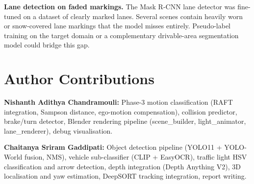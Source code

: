\documentclass[conference]{IEEEtran}
\begin{document}
\textbf{Lane detection on faded markings.}
The Mask R-CNN lane detector was fine-tuned on a dataset of clearly marked
lanes.  Several scenes contain heavily worn or snow-covered lane markings that
the model misses entirely.  Pseudo-label training on the target domain or a
complementary drivable-area segmentation model could bridge this gap.

\section{Author Contributions}

\textbf{Nishanth Adithya Chandramouli:}
Phase-3 motion classification (RAFT integration, Sampson distance, ego-motion
compensation), collision predictor, brake/turn detector, Blender rendering
pipeline (scene\_builder, light\_animator, lane\_renderer), debug visualisation.

\textbf{Chaitanya Sriram Gaddipati:}
Object detection pipeline (YOLO11 + YOLO-World fusion, NMS), vehicle
sub-classifier (CLIP + EasyOCR), traffic light HSV classification and arrow
detection, depth integration (Depth Anything V2), 3D localisation and yaw
estimation, DeepSORT tracking integration, report writing.
\end{document}

